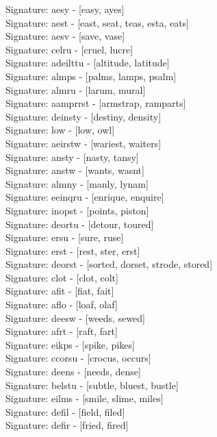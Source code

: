 Signature: {aesy} - [easy, ayes] \\
Signature: {aest} - [east, seat, teas, esta, eats] \\
Signature: {aesv} - [save, vase] \\
Signature: {celru} - [cruel, lucre] \\
Signature: {adeilttu} - [altitude, latitude] \\
Signature: {almps} - [palms, lamps, psalm] \\
Signature: {almru} - [larum, mural] \\
Signature: {aamprrst} - [armstrap, ramparts] \\
Signature: {deinsty} - [destiny, density] \\
Signature: {low} - [low, owl] \\
Signature: {aeirstw} - [wariest, waiters] \\
Signature: {ansty} - [nasty, tansy] \\
Signature: {anstw} - [wants, wasnt] \\
Signature: {almny} - [manly, lynam] \\
Signature: {eeinqru} - [enrique, enquire] \\
Signature: {inopst} - [points, piston] \\
Signature: {deortu} - [detour, toured] \\
Signature: {ersu} - [sure, ruse] \\
Signature: {erst} - [rest, ster, erst] \\
Signature: {deorst} - [sorted, dorset, strode, stored] \\
Signature: {clot} - [clot, colt] \\
Signature: {afit} - [fiat, fait] \\
Signature: {aflo} - [loaf, olaf] \\
Signature: {deesw} - [weeds, sewed] \\
Signature: {afrt} - [raft, fart] \\
Signature: {eikps} - [spike, pikes] \\
Signature: {ccorsu} - [crocus, occurs] \\
Signature: {deens} - [needs, dense] \\
Signature: {belstu} - [subtle, bluest, bustle] \\
Signature: {eilms} - [smile, slime, miles] \\
Signature: {defil} - [field, filed] \\
Signature: {defir} - [fried, fired] \\
